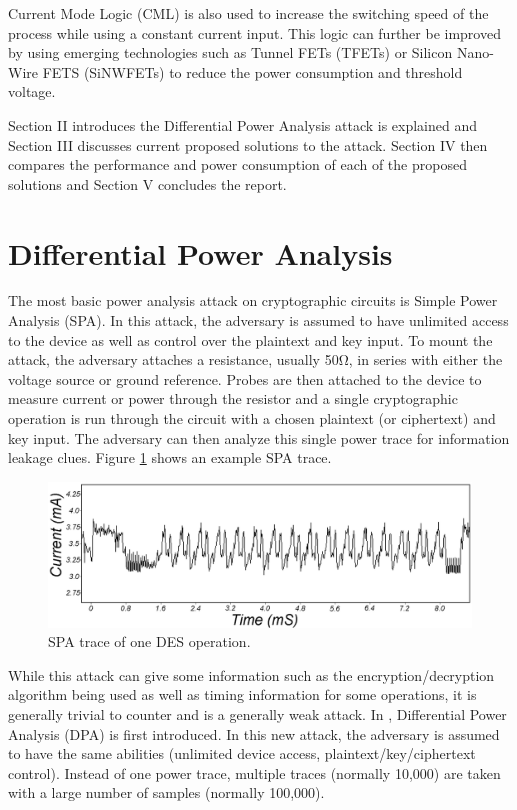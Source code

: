 \documentclass[conference, 12pt]{IEEEtran}
\newcommand{\x}{1}						%
\begin{document}
		Current Mode Logic (CML) is also used to increase the switching speed of the process while using a constant current input. This logic can further be improved by using emerging technologies such as Tunnel FETs (TFETs) or Silicon Nano-Wire FETS (SiNWFETs) to reduce the power consumption and threshold voltage. 

		Section II introduces the Differential Power Analysis attack is explained and Section III discusses current proposed solutions to the attack. Section IV then compares the performance and power consumption of each of the proposed solutions and Section V concludes the report. 


	\section{Differential Power Analysis}
		The most basic power analysis attack on cryptographic circuits is Simple Power Analysis (SPA). In this attack, the adversary is assumed to have unlimited access to the device as well as control over the plaintext and key input. To mount the attack, the adversary attaches a resistance, usually 50Ω, in series with either the voltage source or ground reference. Probes are then attached to the device to measure current or power through the resistor and a single cryptographic operation is run through the circuit with a chosen plaintext (or ciphertext) and key input. The adversary can then analyze this single power trace for information leakage clues. Figure \ref{SPA} shows an example SPA trace. 

		\begin{figure}[tbp]
			\centering
			\includegraphics[width=\x\linewidth]{ReportFiles/SPA.png}
			\caption{SPA trace of one DES operation.\cite{b7}}
			\label{SPA}
		\end{figure}

		While this attack can give some information such as the encryption/decryption algorithm being used as well as timing information for some operations, it is generally trivial to counter and is a generally weak attack. In \cite{b7}, Differential Power Analysis (DPA) is first introduced. In this new attack, the adversary is assumed to have the same abilities (unlimited device access, plaintext/key/ciphertext control). Instead of one power trace, multiple traces (normally 10,000) are taken with a large number of samples (normally 100,000). 
\end{document}
